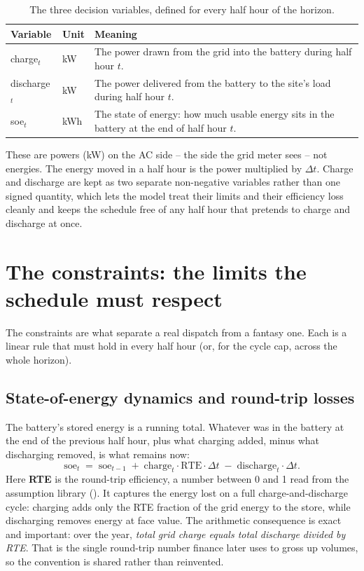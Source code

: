 \begin{table}[H]
\centering
\caption{The three decision variables, defined for every half hour of the horizon.}
\label{tab:vars}
\small\sffamily
\begin{tabularx}{\textwidth}{@{}l l L@{}}
\toprule
\textbf{Variable} & \textbf{Unit} & \textbf{Meaning} \\
\midrule
charge$_t$ & kW & The power drawn from the grid into the battery during half hour $t$. \\
discharge$_t$ & kW & The power delivered from the battery to the site's load during half hour $t$. \\
soe$_t$ & kWh & The state of energy: how much usable energy sits in the battery at the end of half hour $t$. \\
\bottomrule
\end{tabularx}
\end{table}

These are powers (kW) on the AC side -- the side the grid meter sees -- not energies. The energy moved in a half hour is the power multiplied by $\Delta t$. Charge and discharge are kept as two separate non-negative variables rather than one signed quantity, which lets the model treat their limits and their efficiency loss cleanly and keeps the schedule free of any half hour that pretends to charge and discharge at once.

\section{The constraints: the limits the schedule must respect}

The constraints are what separate a real dispatch from a fantasy one. Each is a linear rule that must hold in every half hour (or, for the cycle cap, across the whole horizon).

\subsection{State-of-energy dynamics and round-trip losses}

The battery's stored energy is a running total. Whatever was in the battery at the end of the previous half hour, plus what charging added, minus what discharging removed, is what remains now:
\[
\text{soe}_t \;=\; \text{soe}_{t-1} \;+\; \text{charge}_t \cdot \text{RTE} \cdot \Delta t \;-\; \text{discharge}_t \cdot \Delta t .
\]
Here \textbf{RTE} is the round-trip efficiency, a number between 0 and 1 read from the assumption library (). It captures the energy lost on a full charge-and-discharge cycle: charging adds only the RTE fraction of the grid energy to the store, while discharging removes energy at face value. The arithmetic consequence is exact and important: over the year, \emph{total grid charge equals total discharge divided by RTE}. That is the single round-trip number finance later uses to gross up volumes, so the convention is shared rather than reinvented.

